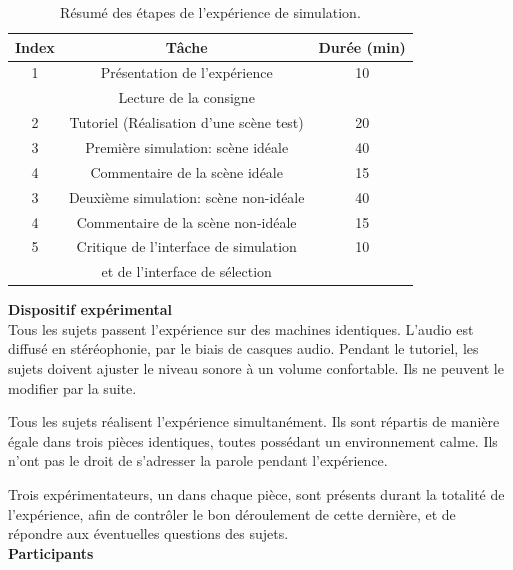 \begin{table}[t]
\centering
\begin{tabular}{c c c} 
Index          & Tâche                               & Durée (min) \\                      
\hline
1 & Présentation de l'expérience                     & 10 \\
  & Lecture de la consigne                           &  \\
\hline
2 & Tutoriel (Réalisation d'une scène test)          & 20 \\
\hline
3 & Première simulation: scène idéale                & 40 \\
\hline
4  & Commentaire de la scène idéale                  & 15 \\
\hline
3 & Deuxième simulation: scène non-idéale            & 40  \\
\hline
4  & Commentaire de la scène non-idéale              & 15 \\
\hline
5 & Critique de l'interface de simulation            & 10 \\
  & et de l'interface de sélection                   & \\
\hline
\end{tabular}
\vspace{0.5mm}
\caption{Résumé des étapes de l’expérience de simulation.}
\label{tab:indSimu}
\end{table}

{\setlength{\parindent}{0cm}\textbf{Dispositif expérimental}} \\

Tous les sujets passent l'expérience sur des machines identiques. L'audio est diffusé en stéréophonie, par le biais de casques audio. Pendant le tutoriel, les sujets doivent ajuster le niveau sonore à un volume confortable. Ils ne peuvent le modifier par la suite.

Tous les sujets réalisent l'expérience simultanément. Ils sont répartis de manière égale dans trois pièces identiques, toutes possédant un environnement calme. Ils n'ont pas le droit de s'adresser la parole pendant l'expérience.

Trois expérimentateurs, un dans chaque pièce, sont présents durant la totalité de l'expérience, afin de contrôler le bon déroulement de cette dernière, et de répondre aux éventuelles questions des sujets.  \\

{\setlength{\parindent}{0cm}\textbf{Participants}} \\

